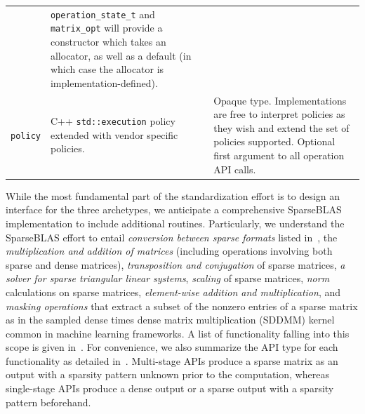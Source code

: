 \documentclass[manuscript,review]{acmart}
\begin{document}
\begin{table}[htbp]
\begin{tabularx}{\linewidth}{l X X}
      & \texttt{operation\_state\_t} and \texttt{matrix\_opt} will provide a constructor which takes an allocator, as well as a default (in which case the allocator is implementation-defined). \\
    \addlinespace
    \texttt{policy} 
      & C++ \texttt{std::execution} policy extended with vendor specific policies. 
      & Opaque type. Implementations are free to interpret policies as they wish and extend the set of policies supported. Optional first argument to all operation API calls. \\
    \bottomrule
  \end{tabularx}
\end{table}

While the most fundamental part of the standardization effort is to design an interface for the three archetypes, we anticipate a comprehensive SparseBLAS implementation to include additional routines. Particularly, we understand the SparseBLAS effort to entail \textit{conversion between sparse formats} listed in~, the \textit{multiplication and addition of matrices} (including operations involving both sparse and dense matrices), \textit{transposition and conjugation} of sparse matrices, \textit{a solver for sparse triangular linear systems}, \textit{scaling} of sparse matrices, \textit{norm} calculations on sparse matrices, \textit{element-wise addition and multiplication}, and \textit{masking operations} that extract a subset of the nonzero entries of a sparse matrix as in the sampled dense times dense matrix multiplication (SDDMM) kernel common in machine learning frameworks. A list of functionality falling into this scope is given in~. For convenience, we also summarize the API type for each functionality as detailed in~. Multi-stage APIs produce a sparse matrix as an output with a sparsity pattern unknown prior to the computation, whereas single-stage APIs produce a dense output or a sparse output with a sparsity pattern beforehand.
\end{document}
